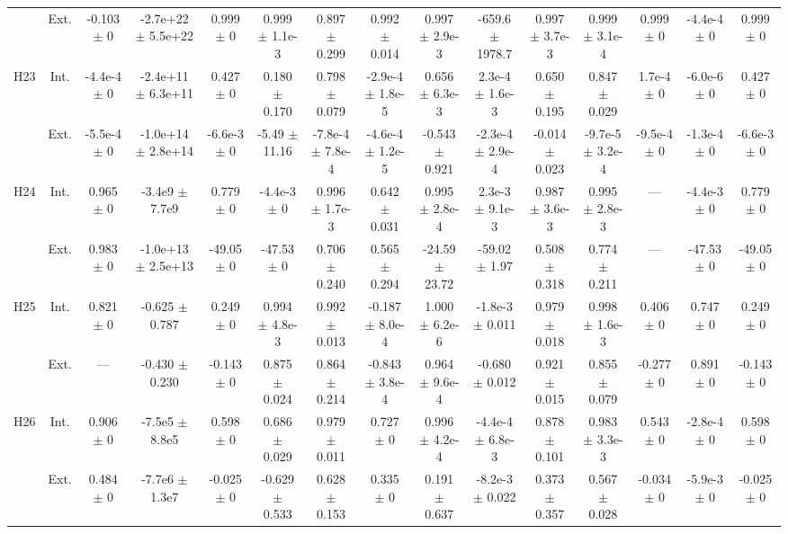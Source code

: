 \begin{table}[htbp]
{\begin{tabular}{@{}ccccccccccccccc@{}}
 & Ext. & -0.103 $\pm$ 0 & -2.7e+22 $\pm$ 5.5e+22 & 0.999 $\pm$ 0 & 0.999 $\pm$ 1.1e-3 & 0.897 $\pm$ 0.299 & 0.992 $\pm$ 0.014 & 0.997 $\pm$ 2.9e-3 & -659.6 $\pm$ 1978.7 & 0.997 $\pm$ 3.7e-3 & 0.999 $\pm$ 3.1e-4 & 0.999 $\pm$ 0 & -4.4e-4 $\pm$ 0 & 0.999 $\pm$ 0 \\
\cline{2-15}
\multirow{2}{*}{H23} & Int. & -4.4e-4 $\pm$ 0 & -2.4e+11 $\pm$ 6.3e+11 & 0.427 $\pm$ 0 & 0.180 $\pm$ 0.170 & 0.798 $\pm$ 0.079 & -2.9e-4 $\pm$ 1.8e-5 & 0.656 $\pm$ 6.3e-3 & 2.3e-4 $\pm$ 1.6e-3 & 0.650 $\pm$ 0.195 & 0.847 $\pm$ 0.029 & 1.7e-4 $\pm$ 0 & -6.0e-6 $\pm$ 0 & 0.427 $\pm$ 0 \\
 & Ext. & -5.5e-4 $\pm$ 0 & -1.0e+14 $\pm$ 2.8e+14 & -6.6e-3 $\pm$ 0 & -5.49 $\pm$ 11.16 & -7.8e-4 $\pm$ 7.8e-4 & -4.6e-4 $\pm$ 1.2e-5 & -0.543 $\pm$ 0.921 & -2.3e-4 $\pm$ 2.9e-4 & -0.014 $\pm$ 0.023 & -9.7e-5 $\pm$ 3.2e-4 & -9.5e-4 $\pm$ 0 & -1.3e-4 $\pm$ 0 & -6.6e-3 $\pm$ 0 \\
\cline{2-15}
\multirow{2}{*}{H24} & Int. & 0.965 $\pm$ 0 & -3.4e9 $\pm$ 7.7e9 & 0.779 $\pm$ 0 & -4.4e-3 $\pm$ 0 & 0.996 $\pm$ 1.7e-3 & 0.642 $\pm$ 0.031 & 0.995 $\pm$ 2.8e-4 & 2.3e-3 $\pm$ 9.1e-3 & 0.987 $\pm$ 3.6e-3 & 0.995 $\pm$ 2.8e-3 & --- & -4.4e-3 $\pm$ 0 & 0.779 $\pm$ 0 \\
 & Ext. & 0.983 $\pm$ 0 & -1.0e+13 $\pm$ 2.5e+13 & -49.05 $\pm$ 0 & -47.53 $\pm$ 0 & 0.706 $\pm$ 0.240 & 0.565 $\pm$ 0.294 & -24.59 $\pm$ 23.72 & -59.02 $\pm$ 1.97 & 0.508 $\pm$ 0.318 & 0.774 $\pm$ 0.211 & --- & -47.53 $\pm$ 0 & -49.05 $\pm$ 0 \\
\cline{2-15}
\multirow{2}{*}{H25} & Int. & 0.821 $\pm$ 0 & -0.625 $\pm$ 0.787 & 0.249 $\pm$ 0 & 0.994 $\pm$ 4.8e-3 & 0.992 $\pm$ 0.013 & -0.187 $\pm$ 8.0e-4 & 1.000 $\pm$ 6.2e-6 & -1.8e-3 $\pm$ 0.011 & 0.979 $\pm$ 0.018 & 0.998 $\pm$ 1.6e-3 & 0.406 $\pm$ 0 & 0.747 $\pm$ 0 & 0.249 $\pm$ 0 \\
 & Ext. & --- & -0.430 $\pm$ 0.230 & -0.143 $\pm$ 0 & 0.875 $\pm$ 0.024 & 0.864 $\pm$ 0.214 & -0.843 $\pm$ 3.8e-4 & 0.964 $\pm$ 9.6e-4 & -0.680 $\pm$ 0.012 & 0.921 $\pm$ 0.015 & 0.855 $\pm$ 0.079 & -0.277 $\pm$ 0 & 0.891 $\pm$ 0 & -0.143 $\pm$ 0 \\
\cline{2-15}
\multirow{2}{*}{H26} & Int. & 0.906 $\pm$ 0 & -7.5e5 $\pm$ 8.8e5 & 0.598 $\pm$ 0 & 0.686 $\pm$ 0.029 & 0.979 $\pm$ 0.011 & 0.727 $\pm$ 0 & 0.996 $\pm$ 4.2e-4 & -4.4e-4 $\pm$ 6.8e-3 & 0.878 $\pm$ 0.101 & 0.983 $\pm$ 3.3e-3 & 0.543 $\pm$ 0 & -2.8e-4 $\pm$ 0 & 0.598 $\pm$ 0 \\
 & Ext. & 0.484 $\pm$ 0 & -7.7e6 $\pm$ 1.3e7 & -0.025 $\pm$ 0 & -0.629 $\pm$ 0.533 & 0.628 $\pm$ 0.153 & 0.335 $\pm$ 0 & 0.191 $\pm$ 0.637 & -8.2e-3 $\pm$ 0.022 & 0.373 $\pm$ 0.357 & 0.567 $\pm$ 0.028 & -0.034 $\pm$ 0 & -5.9e-3 $\pm$ 0 & -0.025 $\pm$ 0 \\

\end{tabular}}
\end{table}
